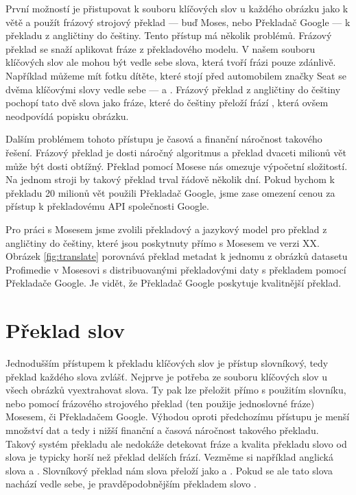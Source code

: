 První možností je přistupovat k souboru klíčových slov u každého obrázku jako k větě a použít frázový strojový překlad --- buď Moses, nebo Překladač Google\cite{googletranslate} --- k překladu z angličtiny do češtiny. Tento přístup má několik problémů. Frázový překlad se snaží aplikovat fráze z překladového modelu. V našem souboru klíčových slov ale mohou být vedle sebe slova, která tvoří frázi pouze zdánlivě. Například můžeme mít fotku dítěte, které stojí před automobilem značky Seat se dvěma klíčovými slovy vedle sebe ---  a . Frázový překlad z angličtiny do češtiny pochopí tato dvě slova jako fráze, které do češtiny přeloží frází , která ovšem neodpovídá popisku obrázku.

Dalším problémem tohoto přístupu je časová a finanční náročnost takového řešení. Frázový překlad je dosti náročný algoritmus a překlad dvaceti milionů vět může být dosti obtížný. Překlad pomocí Mosese nás omezuje výpočetní složitostí. Na jednom stroji by takový překlad trval řádově několik dní. Pokud bychom k překladu 20 milionů vět použili Překladač Google, jsme zase omezení cenou za přístup k překladovému API společnosti Google.

Pro práci s Mosesem jsme zvolili překladový a jazykový model pro překlad z angličtiny do češtiny, které jsou poskytnuty přímo s Mosesem ve verzi XX. Obrázek \ref{fig:translate} porovnává překlad metadat k jednomu z obrázků datasetu Profimedie v Mosesovi s distribuovanými překladovými daty s překladem pomocí Překladače Google. Je vidět, že Překladač Google poskytuje kvalitnější překlad. 

\section{Překlad slov}

Jednodušším přístupem k překladu klíčových slov je přístup slovníkový, tedy překlad každého slova zvlášť. Nejprve je potřeba ze souboru klíčových slov u všech obrázků vyextrahovat slova. Ty pak lze přeložit přímo s použitím slovníku, nebo pomocí frázového strojového překlad (ten použije jednoslovné fráze) Mosesem, či Překladačem Google. Výhodou oproti předchozímu přístupu je menší množství dat a tedy i nižší finanční a časová náročnost takového překladu. Takový systém překladu ale nedokáže detekovat fráze a kvalita překladu slovo od slova je typicky horší než překlad delších frází. Vezměme si například anglická slova  a . Slovníkový překlad nám slova přeloží jako  a . Pokud se ale tato slova nachází vedle sebe, je pravděpodobnějším překladem slovo .

